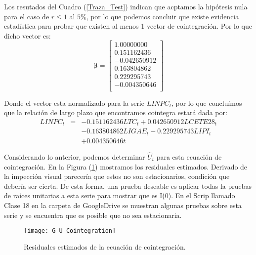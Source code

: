 \documentclass[
  a4paper,
]{article}
\begin{document}
Los resutados del Cuadro (\ref{Traza_Test}) indican que acptamos la
hipótesis nula para el caso de \(r \leq 1\) al \(5\%\), por lo que
podemos concluir que existe evidencia estadística para probar que
existen al menos 1 vector de cointegración. Por lo que dicho vector es:
\[
    \boldsymbol{\beta} = \left[ 
    \begin{matrix}
    1.00000000 \\
    0.151162436 \\
    -0.042650912 \\
    0.163804862 \\
    0.229295743 \\
    -0.004350646 \\
    \end{matrix} \right]
\]

Donde el vector esta normalizado para la serie \(LINPC_t\), por lo que
concluímos que la relación de largo plazo que encontramos cointegra
estará dada por: \begin{eqnarray*}
    LINPC_t & = & -0.151162436 LTC_t + 0.042650912 LCETE28_t \\
    &  & - 0.163804862 LIGAE_t - 0.229295743 LIPI_t \\
    &  & + 0.004350646 t
\end{eqnarray*}

Considerando lo anterior, podemos determinar \(\hat{U}_t\) para esta
ecuación de cointegración. En la Figura (\ref{G_U_Cointegration})
mostramos los residuales estimados. Derivado de la impección visual
parecería que estos no son estacionarios, condición que debería ser
cierta. De esta forma, una prueba deseable es aplicar todas la pruebas
de raíces unitarias a esta serie para mostrar que es I(0). En el Scrip
llamado Clase 18 en la carpeta de GoogleDrive se muestran algunas
pruebas sobre esta serie y se encuentra que es posible que no sea
estacionaria.

\begin{figure}
  \centering
    \texttt{[image: G\_U\_Cointegration]}
  \caption{Residuales estimados de la ecuación de cointegración.}
  \label{G_U_Cointegration}
\end{figure}


\printbibliography
\end{document}
